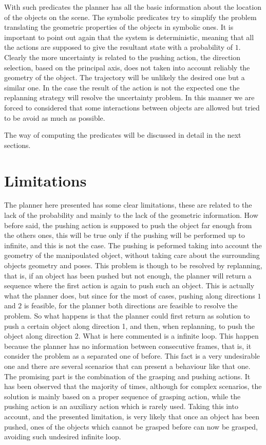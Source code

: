 With such predicates the planner has all the basic information about the location of the objects on the scene. The symbolic predicates try to simplify the problem translating the geometric properties of the objects in symbolic ones. It is important to point out again that the system is deterministic, meaning that all the actions are supposed to give the resultant state with a probability of $1$. Clearly the more uncertainty is related to the pushing action, the direction selection, based on the principal axis, does not taken into account reliably the geometry of the object. The trajectory will be unlikely the desired one but a similar one. In the case the result of the action is not the expected one the replanning strategy will resolve the uncertainty problem. In this manner we are forced to considered that some interactions between objects are allowed but tried to be avoid as much as possible. 

\mbox{}

The way of computing the predicates will be discussed in detail in the next sections.



\section{Limitations}
The planner here presented has some clear limitations, these are related to the lack of the probability and mainly to the lack of the geometric information. 
How before said, the pushing action is supposed to push the object far enough from the others ones, this will be true only if the pushing will be performed up to infinite, and this is not the case. The pushing is peformed taking into account the geometry of the manipoulated object, without taking care about the surrounding objects geometry and poses. This problem is though to be resolved by replanning, that is, if an object has been pushed but not enough, the planner will return a sequence where the first action is again to push such an object. This is actually what the planner does, but since for the most of cases, pushing along directions $1$ and $2$ is feasible, for the planner both directions are feasible to resolve the problem. So what happens is that the planner could first return as solution to push a certain object along direction 1, and then, when replanning, to push the object along direction 2. What is here commented is a infinite loop. This happen because the planner has no information between consecutive frames, that is, it consider the problem as a separated one of before. 
This fact is a very undesirable one and there are several scenarios that can present a behaviour like that one. The promising part is the combination of the grasping and pushing actions. It has been observed that the majority of times, although for complex scenarios, the solution is mainly based on a proper sequence of grasping action, while the pushing action is an auxiliary action which is rarely used. Taking this into account, and the presented limitation, is very likely that once an object has been pushed, ones of the objects which cannot be grasped before can now be grasped, avoiding such undesired infinite loop.  